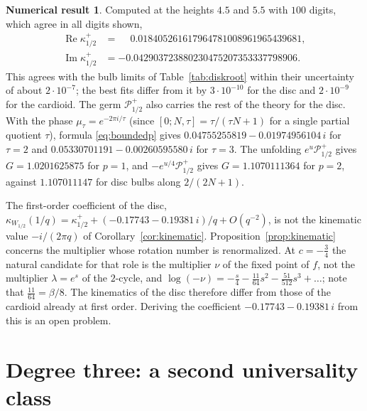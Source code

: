 \documentclass[11pt]{amsart}
\theoremstyle{definition}
\newtheorem{observation}[theorem]{Numerical result}
\theoremstyle{remark}
\newcommand{\Ph}{\mathcal{P}^+_{1/2}}
\begin{document}
\begin{observation}\label{obs:half}
Computed at the heights $4.5$ and $5.5$ with $100$ digits, which agree in all digits shown,
\begin{align*}
\operatorname{Re}\kappa^+_{1/2}&=\phantom{-}0.018405261617964781008961965439681,\\
\operatorname{Im}\kappa^+_{1/2}&=-0.042903723880230475207353337798906.
\end{align*}
This agrees with the bulb limits of Table~\ref{tab:diskroot} within their uncertainty of about $2\cdot10^{-7}$; the best fits differ from it by $3\cdot10^{-10}$ for the disc and $2\cdot10^{-9}$ for the cardioid. The germ $\Ph$ also carries the rest of the theory for the disc. With the phase $\mu_\tau=e^{-2\pi i/\tau}$ (since $[0;N,\tau]=\tau/(\tau N+1)$ for a single partial quotient $\tau$), formula \eqref{eq:boundedp} gives $0.04755255819-0.01974956104\,i$ for $\tau=2$ and $0.05330701191-0.00260595580\,i$ for $\tau=3$. The unfolding $e^{u}\Ph$ gives $G=1.0201625875$ for $p=1$, and $-e^{u/4}\Ph$ gives $G=1.1070111364$ for $p=2$, against $1.107011147$ for disc bulbs along $2/(2N+1)$.
\end{observation}

The first-order coefficient of the disc, $\kappa_{W_{1/2}}(1/q)=\kappa^+_{1/2}+(-0.17743-0.19381\,i)/q+O(q^{-2})$, is not the kinematic value $-i/(2\pi q)$ of Corollary~\ref{cor:kinematic}. Proposition~\ref{prop:kinematic} concerns the multiplier whose rotation number is renormalized. At $c=-\frac34$ the natural candidate for that role is the multiplier $\nu$ of the fixed point of $f$, not the multiplier $\lambda=e^{s}$ of the $2$-cycle, and $\log(-\nu)=-\frac s4-\frac{11}{64}s^2-\frac{51}{512}s^3+\dots$; note that $\frac{11}{64}=\beta/8$. The kinematics of the disc therefore differ from those of the cardioid already at first order. Deriving the coefficient $-0.17743-0.19381\,i$ from this is an open problem.

\section{Degree three: a second universality class}\label{sec:degree3}
\end{document}
